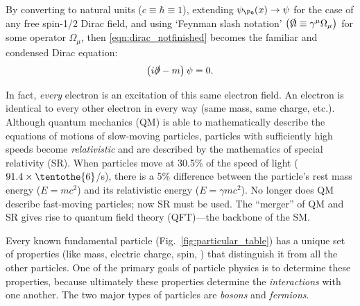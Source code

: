 By converting to natural units ($c\equiv \hbar \equiv 1$),
extending $\psi_{\Pe}(x) \to \psi$ for the case of any free spin-1/2 Dirac field,
and using `Feynman slash notation' $\left( {\slashed \Omega} \equiv \gamma^\mu \Omega_\mu \right)$ for some operator $\Omega_\mu$,
then \cref{eqn:dirac_notfinished} becomes the familiar and condensed Dirac equation:
\begin{equation}
    \left( i {\slashed \partial} - m \right) \psi = 0.
    \label{eqn:dirac}
\end{equation}
    
In fact, \emph{every} electron is an excitation of this same electron field. 
An electron is identical to every other electron in every way (same mass, same charge, etc.).
Although quantum mechanics (QM) is able to mathematically describe the equations of motions of slow-moving particles, particles with sufficiently high speeds become \emph{relativistic} and are described by the mathematics of special relativity (SR).
When particles move at 30.5\% of the speed of light ($91.4 \times \tentothe{6}$\meter/s), there is a 5\% difference between the particle's rest mass energy ($E = mc^2$) and its relativistic energy ($E = \gamma mc^2$).
No longer does QM describe fast-moving particles; now SR must be used.
The ``merger'' of QM and SR gives rise to quantum field theory (QFT)---the backbone of the SM.

Every known fundamental particle (Fig.~\ref{fig:particular_table}) has a unique set of properties (like mass, electric charge, spin, \etc) that distinguish it from all the other particles. 
One of the primary goals of particle physics is to determine these properties, because ultimately these properties determine the  \emph{interactions} with one another. 
The two major types of particles are \emph{bosons} and \emph{fermions}.

